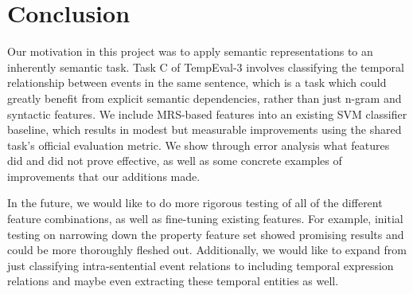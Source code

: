 \documentclass[11pt]{article}
\begin{document}
\section{Conclusion}
\label{conclusion}

Our motivation in this project was to apply semantic representations to an inherently semantic task. Task C of TempEval-3 involves classifying the temporal relationship between events in the same sentence, which is a task which could greatly benefit from explicit semantic dependencies, rather than just n-gram and syntactic features. We include MRS-based features into an existing SVM classifier baseline, which results in modest but measurable improvements using the shared task's official evaluation metric. We show through error analysis what features did and did not prove effective, as well as some concrete examples of improvements that our additions made.

In the future, we would like to do more rigorous testing of all of the different feature combinations, as well as fine-tuning existing features. For example, initial testing on narrowing down the property feature set showed promising results and could be more thoroughly fleshed out. Additionally, we would like to expand from just classifying intra-sentential event relations to including temporal expression relations and maybe even extracting these temporal entities as well.

%

%
%
\end{document}
